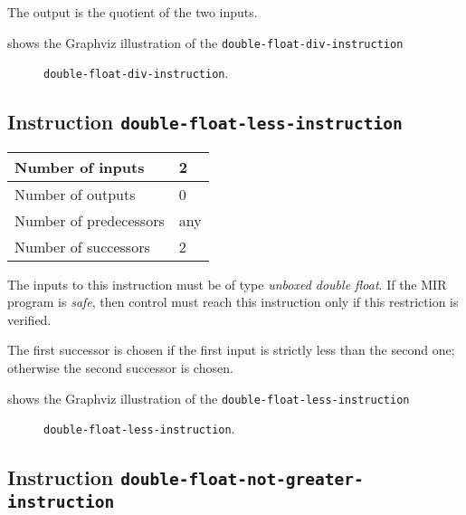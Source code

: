 The output is the quotient of the two inputs.

 shows the Graphviz illustration of the
\texttt{double-float-div-instruction}

\begin{figure}
\begin{center}
\end{center}
\caption{\label{fig-double-float-div-instruction}
\texttt{double-float-div-instruction}.}
\end{figure}

\subsection{Instruction \texttt{double-float-less-instruction}}
\label{mir-instruction-double-float-less}

\begin{tabular}{|l|l|}
\hline
Number of inputs & 2\\
\hline
Number of outputs & 0\\
\hline
Number of predecessors & any\\
\hline
Number of successors & 2\\
\hline
\end{tabular}

The inputs to this instruction must be of type \emph{unboxed double
  float}.  If the MIR program is \emph{safe}, then control must reach
this instruction only if this restriction is verified.

The first successor is chosen if the first input is strictly less than
the second one; otherwise the second successor is chosen. 

 shows the Graphviz illustration of the
\texttt{double-float-less-instruction}

\begin{figure}
\begin{center}
\end{center}
\caption{\label{fig-double-float-less-instruction}
\texttt{double-float-less-instruction}.}
\end{figure}

\subsection{Instruction \texttt{double-float-not-greater-instruction}}
\label{mir-instruction-double-float-not-greater}

